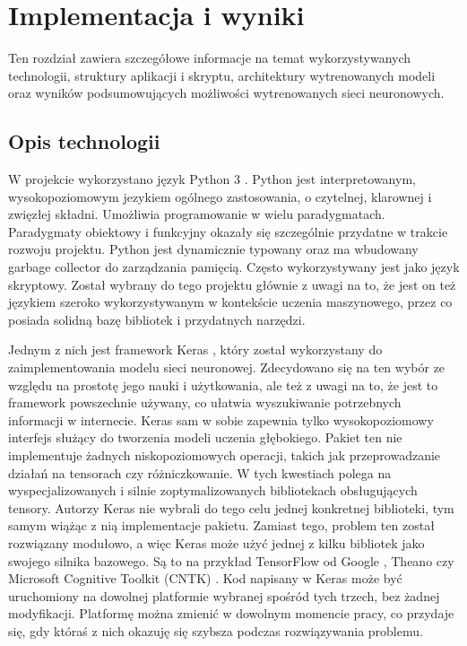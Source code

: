 \chapter{Implementacja i wyniki}
\thispagestyle{chapterBeginStyle}
\label{chapter5}


Ten rozdział zawiera szczegółowe informacje na temat wykorzystywanych technologii, struktury aplikacji i skryptu, architektury wytrenowanych modeli oraz wyników podsumowujących możliwości wytrenowanych sieci neuronowych.


\section{Opis technologii}
W projekcie wykorzystano język Python 3 \cite{Python}. Python jest interpretowanym, wysokopoziomowym jezykiem  ogólnego zastosowania, o czytelnej, klarownej i zwięzłej składni. Umożliwia programowanie w wielu paradygmatach. Paradygmaty obiektowy i funkcyjny okazały się szczególnie przydatne w trakcie rozwoju projektu. Python jest dynamicznie typowany oraz ma wbudowany garbage collector do zarządzania pamięcią. Często wykorzystywany jest jako język skryptowy. Został wybrany do tego projektu głównie z uwagi na to, że jest on też językiem szeroko wykorzystywanym w kontekście uczenia maszynowego, przez co posiada solidną bazę bibliotek i przydatnych narzędzi.

Jednym z nich jest framework Keras \cite{Keras}, który został wykorzystany do zaimplementowania modelu sieci neuronowej. Zdecydowano się na ten wybór ze względu na prostotę jego nauki i użytkowania, ale też z uwagi na to, że jest to framework powszechnie używany, co ułatwia wyszukiwanie potrzebnych informacji w internecie. Keras sam w sobie zapewnia tylko wysokopoziomowy interfejs służący do tworzenia modeli uczenia głębokiego. Pakiet ten nie implementuje żadnych niskopoziomowych operacji, takich jak przeprowadzanie działań na tensorach czy różniczkowanie. W tych kwestiach polega na wyspecjalizowanych i silnie zoptymalizowanych bibliotekach obsługujących tensory. Autorzy Keras nie wybrali do tego celu jednej konkretnej biblioteki, tym samym wiążąc z nią implementacje pakietu. Zamiast tego, problem ten został rozwiązany modułowo, a więc Keras może użyć jednej z kilku bibliotek jako swojego silnika bazowego. Są to na przykład TensorFlow od Google \cite{TensorFlow}, Theano \cite{Theano} czy Microsoft Cognitive Toolkit (CNTK) \cite{CNTK}. Kod napisany w Keras może być uruchomiony na dowolnej platformie wybranej spośród tych trzech, bez żadnej modyfikacji. Platformę można zmienić w dowolnym momencie pracy, co przydaje się, gdy któraś z nich okazuję się szybsza podczas rozwiązywania problemu.

